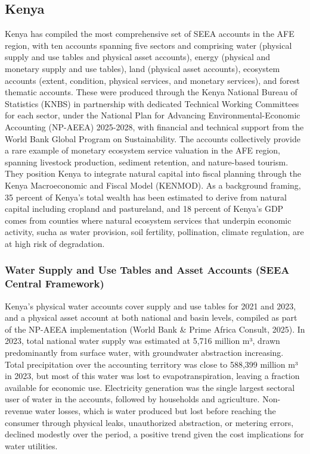 \documentclass[
  letterpaper,
  DIV=11,
  numbers=noendperiod]{scrartcl}
\begin{document}
\subsection{Kenya}\label{kenya}

Kenya has compiled the most comprehensive set of SEEA accounts in the
AFE region, with ten accounts spanning five sectors and comprising water
(physical supply and use tables and physical asset accounts), energy
(physical and monetary supply and use tables), land (physical asset
accounts), ecosystem accounts (extent, condition, physical services, and
monetary services), and forest thematic accounts. These were produced
through the Kenya National Bureau of Statistics (KNBS) in partnership
with dedicated Technical Working Committees for each sector, under the
National Plan for Advancing Environmental-Economic Accounting (NP-AEEA)
2025-2028, with financial and technical support from the World Bank
Global Program on Sustainability. The accounts collectively provide a
rare example of monetary ecosystem service valuation in the AFE region,
spanning livestock production, sediment retention, and nature-based
tourism. They position Kenya to integrate natural capital into fiscal
planning through the Kenya Macroeconomic and Fiscal Model (KENMOD). As a
background framing, 35 percent of Kenya's total wealth has been
estimated to derive from natural capital including cropland and
pastureland, and 18 percent of Kenya's GDP comes from counties where
natural ecosystem services that underpin economic activity, sucha as
water provision, soil fertility, pollination, climate regulation, are at
high risk of degradation.

\subsubsection{Water Supply and Use Tables and Asset Accounts (SEEA
Central
Framework)}\label{water-supply-and-use-tables-and-asset-accounts-seea-central-framework}

Kenya's physical water accounts cover supply and use tables for 2021 and
2023, and a physical asset account at both national and basin levels,
compiled as part of the NP-AEEA implementation (World Bank \& Prime
Africa Consult, 2025). In 2023, total national water supply was
estimated at 5,716 million m³, drawn predominantly from surface water,
with groundwater abstraction increasing. Total precipitation over the
accounting territory was close to 588,399 million m³ in 2023, but most
of this water was lost to evapotranspiration, leaving a fraction
available for economic use. Electricity generation was the single
largest sectoral user of water in the accounts, followed by households
and agriculture. Non-revenue water losses, which is water produced but
lost before reaching the consumer through physical leaks, unauthorized
abstraction, or metering errors, declined modestly over the period, a
positive trend given the cost implications for water utilities.
\end{document}
